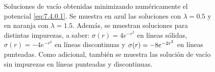 \begin{figure}[t]
	\centering
	\quad
	\caption{Soluciones de vacío obtenidas minimizando numéricamente el potencial \eqref{eq:7.4.0.1}. Se muestra en azul las soluciones con $\lambda = 0.5$ y en naranja con $\lambda = 1.5$. Además, se muestran soluciones para distintas impurezas, a saber: $\sigma(r)=4 e^{-r^2}$ en líneas sólidas, $\sigma(r) = -4e^{-r^2}$ en líneas discontinuas y $\sigma(r)=-8e^{-2r^2}$ en líneas punteadas. Como adicional, también se muestra las solución de vacío sin impurezas en líneas punteadas y discontinuas.}
	\label{fig:field_gauss}
\end{figure}

